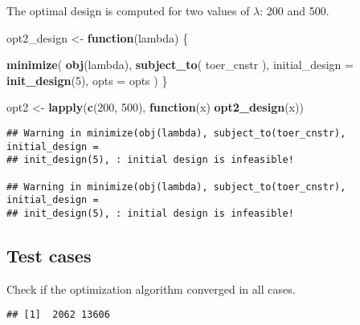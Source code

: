 \documentclass[]{book}
\newenvironment{Shaded}{\begin{snugshade}}{\end{snugshade}}
\newcommand{\ControlFlowTok}[1]{\textcolor[rgb]{0.13,0.29,0.53}{\textbf{#1}}}
\newcommand{\DataTypeTok}[1]{\textcolor[rgb]{0.13,0.29,0.53}{#1}}
\newcommand{\DecValTok}[1]{\textcolor[rgb]{0.00,0.00,0.81}{#1}}
\newcommand{\KeywordTok}[1]{\textcolor[rgb]{0.13,0.29,0.53}{\textbf{#1}}}
\newcommand{\NormalTok}[1]{#1}
\newcommand{\OperatorTok}[1]{\textcolor[rgb]{0.81,0.36,0.00}{\textbf{#1}}}
\newcommand{\StringTok}[1]{\textcolor[rgb]{0.31,0.60,0.02}{#1}}
\begin{document}
The optimal design is computed for two values of \(\lambda\): 200 and 500.

\begin{Shaded}
\begin{Highlighting}[]
\NormalTok{opt2_design <-}\StringTok{ }\ControlFlowTok{function}\NormalTok{(lambda) \{}

    \KeywordTok{minimize}\NormalTok{(}
        \KeywordTok{obj}\NormalTok{(lambda),}
        \KeywordTok{subject_to}\NormalTok{(}
\NormalTok{            toer_cnstr}
\NormalTok{        ),}
        \DataTypeTok{initial_design =} \KeywordTok{init_design}\NormalTok{(}\DecValTok{5}\NormalTok{),}
        \DataTypeTok{opts =}\NormalTok{ opts}
\NormalTok{    )}
\NormalTok{\}}

\NormalTok{opt2 <-}\StringTok{ }\KeywordTok{lapply}\NormalTok{(}\KeywordTok{c}\NormalTok{(}\DecValTok{200}\NormalTok{, }\DecValTok{500}\NormalTok{), }\ControlFlowTok{function}\NormalTok{(x) }\KeywordTok{opt2_design}\NormalTok{(x))}
\end{Highlighting}
\end{Shaded}

\begin{verbatim}
## Warning in minimize(obj(lambda), subject_to(toer_cnstr), initial_design =
## init_design(5), : initial design is infeasible!

## Warning in minimize(obj(lambda), subject_to(toer_cnstr), initial_design =
## init_design(5), : initial design is infeasible!
\end{verbatim}

\hypertarget{test-cases-11}{%
\subsection{Test cases}\label{test-cases-11}}

Check if the optimization algorithm converged in all cases.

\begin{Shaded}
\end{Shaded}

\begin{verbatim}
## [1]  2062 13606
\end{verbatim}
\end{document}
